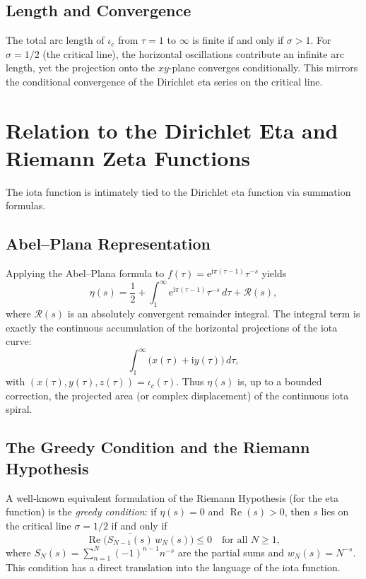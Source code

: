 \documentclass[11pt]{article}
\newcommand{\iu}{\mathrm{i}} %
\newcommand{\e}{\mathrm{e}}
\DeclareMathOperator{\ReOp}{Re}
\begin{document}
\subsection{Length and Convergence}
The total arc length of $\iota_c$ from $\tau = 1$ to $\infty$ is finite if and only if $\sigma > 1$.  For $\sigma = 1/2$ (the critical line), the horizontal oscillations contribute an infinite arc length, yet the projection onto the $xy$-plane converges conditionally.  This mirrors the conditional convergence of the Dirichlet eta series on the critical line.

\section{Relation to the Dirichlet Eta and Riemann Zeta Functions}

The iota function is intimately tied to the Dirichlet eta function via summation formulas.

\subsection{Abel--Plana Representation}
Applying the Abel--Plana formula to $f(\tau) = \e^{\iu\pi(\tau-1)} \tau^{-s}$ yields
\begin{equation}
  \eta(s) = \frac{1}{2} + \int_1^\infty \e^{\iu\pi(\tau-1)} \tau^{-s}\,d\tau + \mathcal{R}(s),
  \label{eq:abel_plana}
\end{equation}
where $\mathcal{R}(s)$ is an absolutely convergent remainder integral.  The integral term is exactly the continuous accumulation of the horizontal projections of the iota curve:
\[
  \int_1^\infty \bigl( x(\tau) + \iu y(\tau) \bigr) \,d\tau,
\]
with $(x(\tau), y(\tau), z(\tau)) = \iota_c(\tau)$.  Thus $\eta(s)$ is, up to a bounded correction, the projected area (or complex displacement) of the continuous iota spiral.

\subsection{The Greedy Condition and the Riemann Hypothesis}
A well‑known equivalent formulation of the Riemann Hypothesis (for the eta function) is the \emph{greedy condition}: if $\eta(s) = 0$ and $\ReOp(s) > 0$, then $s$ lies on the critical line $\sigma = 1/2$ if and only if
\begin{equation}
  \ReOp\bigl( \overline{S_{N-1}(s)}\, w_N(s) \bigr) \le 0 \quad \text{for all } N \ge 1,
  \label{eq:greedy_disc}
\end{equation}
where $S_N(s) = \sum_{n=1}^N (-1)^{n-1} n^{-s}$ are the partial sums and $w_N(s) = N^{-s}$.  This condition has a direct translation into the language of the iota function.
\end{document}
